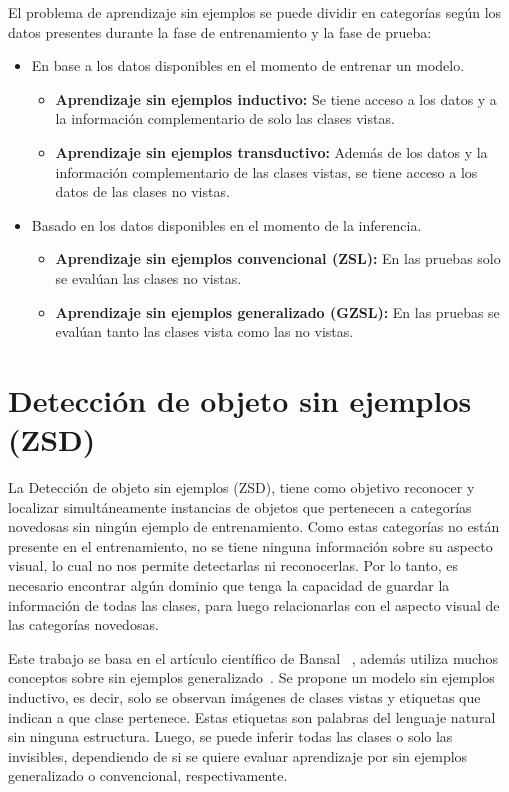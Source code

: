 El problema de aprendizaje sin ejemplos se puede dividir en categorías según los datos presentes durante la fase de entrenamiento y la fase de prueba:
\begin{itemize}
	\item En base a los datos disponibles en el momento de entrenar un modelo.
	\begin{itemize}
		\item \textbf{Aprendizaje sin ejemplos inductivo:} Se tiene acceso a los datos y a la información complementario de solo las clases vistas.
		\item \textbf{Aprendizaje sin ejemplos transductivo:} Además de los datos y la información complementario de las clases vistas,  se tiene acceso a los datos de las clases no vistas.
	\end{itemize}
	\item Basado en los datos disponibles en el momento de la inferencia.
	\begin{itemize}
		\item \textbf{Aprendizaje sin ejemplos convencional (ZSL):} En las pruebas solo se evalúan las clases no vistas.
		\item \textbf{Aprendizaje sin ejemplos generalizado (GZSL):} En las pruebas se evalúan tanto las clases vista como las no vistas.
	\end{itemize}
\end{itemize}

\section {Detección de objeto sin ejemplos (ZSD)} \label{sec:detecciondeobjetopordisparocero}
La Detección de objeto sin ejemplos (ZSD), tiene como objetivo reconocer y localizar simultáneamente instancias de objetos que pertenecen a categorías novedosas sin ningún ejemplo de entrenamiento. Como estas categorías no están presente en el entrenamiento, no se tiene ninguna información sobre su aspecto visual, lo cual no nos permite detectarlas ni reconocerlas. Por lo tanto, es necesario encontrar algún dominio que tenga la capacidad de guardar la información de todas las clases, para luego relacionarlas con el aspecto visual de las categorías novedosas.

Este trabajo se basa en el artículo científico de Bansal \etal ~\cite{bansal2018zero}, además utiliza muchos conceptos sobre sin ejemplos generalizado~\cite{zero-shot-generalizado}. Se propone un modelo sin ejemplos inductivo, es decir, solo se observan imágenes de clases vistas y etiquetas que indican a que clase pertenece. Estas etiquetas son palabras del lenguaje natural sin ninguna estructura. Luego, se puede inferir todas las clases o solo las invisibles, dependiendo de si se quiere evaluar aprendizaje por sin ejemplos generalizado o convencional, respectivamente.\\ 


